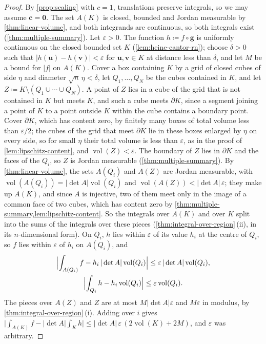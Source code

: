 \begin{proof}
By \cref{prop:scaling} with $c=1$, translations preserve integrals, so we may assume $\mathbf c=\mathbf 0$. The set $A(K)$ is closed, bounded and Jordan measurable by \cref{thm:linear-volume}, and both integrands are continuous, so both integrals exist (\cref{thm:multiple-summary}). Let $\varepsilon>0$. The function $h\coloneqq f\circ\mathbf g$ is uniformly continuous on the closed bounded set $K$ (\cref{lem:heine-cantor-rn}); choose $\delta>0$ such that $|h(\mathbf u)-h(\mathbf v)|<\varepsilon$ for $\mathbf u,\mathbf v\in K$ at distance less than $\delta$, and let $M$ be a bound for $|f|$ on $A(K)$. Cover a box containing $K$ by a grid of closed cubes of side $\eta$ and diameter $\sqrt n\,\eta<\delta$, let $Q_1,\ldots,Q_N$ be the cubes contained in $K$, and let $Z\coloneqq K\setminus(Q_1\cup\cdots\cup Q_N)$. A point of $Z$ lies in a cube of the grid that is not contained in $K$ but meets $K$, and such a cube meets $\partial K$, since a segment joining a point of $K$ to a point outside $K$ within the cube contains a boundary point. Cover $\partial K$, which has content zero, by finitely many boxes of total volume less than $\varepsilon/2$; the cubes of the grid that meet $\partial K$ lie in these boxes enlarged by $\eta$ on every side, so for small $\eta$ their total volume is less than $\varepsilon$, as in the proof of \cref{lem:lipschitz-content}, and $\operatorname{vol}(Z)<\varepsilon$. The boundary of $Z$ lies in $\partial K$ and the faces of the $Q_i$, so $Z$ is Jordan measurable (\cref{thm:multiple-summary}). By \cref{thm:linear-volume}, the sets $A(Q_i)$ and $A(Z)$ are Jordan measurable, with $\operatorname{vol}(A(Q_i))=|\det A|\operatorname{vol}(Q_i)$ and $\operatorname{vol}(A(Z))<|\det A|\,\varepsilon$; they make up $A(K)$, and since $A$ is injective, two of them meet only in the image of a common face of two cubes, which has content zero by \cref{thm:multiple-summary,lem:lipschitz-content}. So the integrals over $A(K)$ and over $K$ split into the sums of the integrals over these pieces (\cref{thm:integral-over-region}\,(ii), in its $n$-dimensional form). On $Q_i$, $h$ lies within $\varepsilon$ of its value $h_i$ at the centre of $Q_i$, so $f$ lies within $\varepsilon$ of $h_i$ on $A(Q_i)$, and
\begin{gather*}
\Bigl|\int_{A(Q_i)}f-h_i\,|\det A|\operatorname{vol}(Q_i)\Bigr|\le\varepsilon\,|\det A|\operatorname{vol}(Q_i),\\
\Bigl|\int_{Q_i}h-h_i\operatorname{vol}(Q_i)\Bigr|\le\varepsilon\operatorname{vol}(Q_i).
\end{gather*}
The pieces over $A(Z)$ and $Z$ are at most $M|\det A|\varepsilon$ and $M\varepsilon$ in modulus, by \cref{thm:integral-over-region}\,(i). Adding over $i$ gives $\bigl|\int_{A(K)}f-|\det A|\int_Kh\bigr|\le|\det A|\,\varepsilon\,(2\operatorname{vol}(K)+2M)$, and $\varepsilon$ was arbitrary.
\end{proof}

